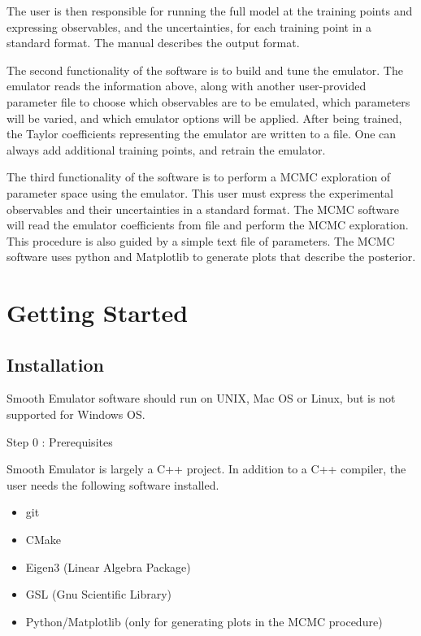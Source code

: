 \documentclass[12pt]{article}
\numberwithin{equation}{section}
\numberwithin{figure}{section}
\begin{document}
 The user is then responsible for running the full model at the training points and expressing observables, and the uncertainties, for each training point in a standard format. The manual describes the output format.

 The second functionality of the software is to build and tune the emulator. The emulator reads the information above, along with another user-provided parameter file to choose which observables are to be emulated, which parameters will be varied, and which emulator options will be applied. After being trained, the Taylor coefficients representing the emulator are written to a file. One can always add additional training points, and retrain the emulator. 

The third functionality of the software is to perform a MCMC exploration of parameter space using the emulator. This user must express the experimental observables and their uncertainties in a standard format. The MCMC software will read the emulator coefficients from file and perform the MCMC exploration. This procedure is also guided by a simple text file of parameters. The MCMC software uses python and Matplotlib to generate plots that describe the posterior. 

\section{Getting Started}\label{sec:simplex}

\subsection{Installation}

Smooth Emulator software should run on UNIX, Mac OS or Linux, but is not supported for Windows OS.

\begin{description}
\item[Step 0 : Prerequisites] 
\end{description}

Smooth Emulator is largely a C++ project. In addition to a C++ compiler, the user needs the following software installed.

\begin{itemize}
    \item git
    \item CMake
    \item Eigen3 (Linear Algebra Package)
    \item GSL (Gnu Scientific Library)
    \item Python/Matplotlib (only for generating plots in the MCMC procedure)
\end{itemize}
\end{document}
